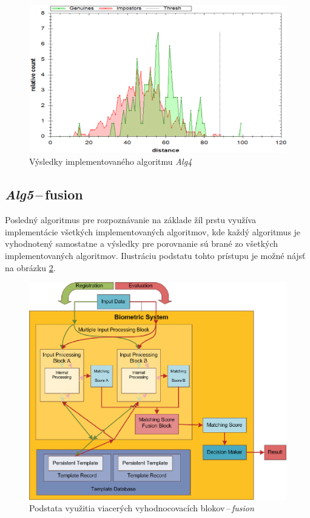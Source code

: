 \documentclass[11pt,a4paper]{article}
\begin{document}
\begin{figure}[ht!]
	\centering
	\includegraphics[width=17cm]{fig/alg4.eps}
	\caption{\label{fig:alg4} Výsledky implementovaného algoritmu \emph{Alg4}}
\end{figure}

\clearpage
\subsection{\emph{Alg5}\,--\,fusion} \label{Alg5}

Posledný algoritmus pre rozpoznávanie na základe žíl prstu využíva implementácie
všetkých implementovaných algoritmov, kde každý algoritmus je vyhodnotený
samostatne a výsledky pre porovnanie sú brané zo všetkých implementovaných
algoritmov. Ilustráciu podstatu tohto prístupu je možné nájsť na obrázku
\ref{fig:fusion}.

\vfill
\begin{figure}[ht!]
	\centering
	\includegraphics[width=12cm]{fig/fusion.eps}
	\caption{\label{fig:fusion} Podstata využitia viacerých vyhodnocovacích
	blokov\,--\,\emph{fusion}}
\end{figure}
\vfill
\vfill
\end{document}
